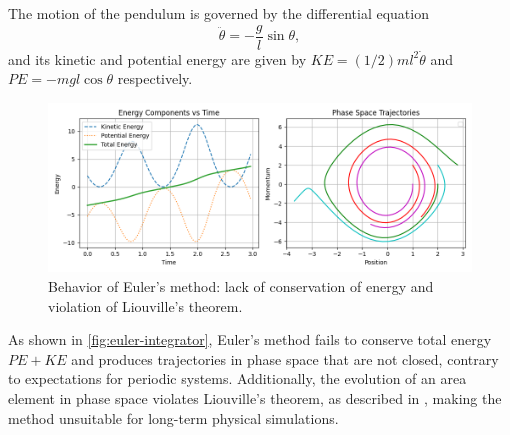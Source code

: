 The motion of the pendulum is governed by the differential equation
\begin{equation*}
    \ddot{\theta} = -\frac{g}{l}\sin\theta,
\end{equation*}
and its kinetic and potential energy are given by $KE = (1/2)ml^2\dot{\theta}$ and $PE = -mgl\cos\theta$ respectively.
\begin{figure}[htp]
    \centering
    \includegraphics[scale=0.6]{img/integrators/euler-pendulum.png}
    \caption{Behavior of Euler's method: lack of conservation of energy and violation of Liouville's theorem.}
    \label{fig:euler-integrator}
\end{figure}
As shown in \autoref{fig:euler-integrator}, Euler's method fails to conserve total energy $PE + KE$ and produces trajectories in phase space that are not closed, contrary to expectations for periodic systems.
Additionally, the evolution of an area element in phase space violates Liouville’s theorem, as described in \cite{taylor2005classical}, making the method unsuitable for long-term physical simulations.

